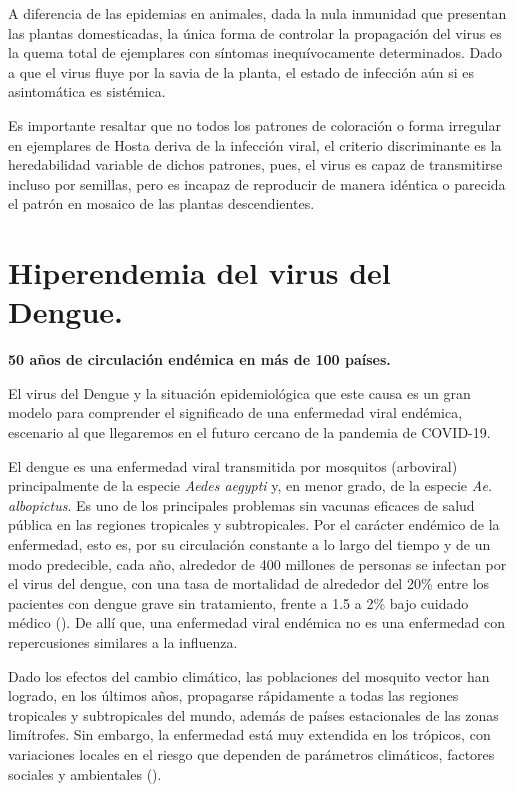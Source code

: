 \documentclass[
  12pt, krantz2,
  spanish,
]{krantz}
\begin{document}
A diferencia de las epidemias en animales, dada la nula inmunidad que presentan las plantas domesticadas, la única forma de controlar la propagación del virus es la quema total de ejemplares con síntomas inequívocamente determinados. Dado a que el virus fluye por la savia de la planta, el estado de infección aún si es asintomática es sistémica.

Es importante resaltar que no todos los patrones de coloración o forma irregular en ejemplares de Hosta deriva de la infección viral, el criterio discriminante es la heredabilidad variable de dichos patrones, pues, el virus es capaz de transmitirse incluso por semillas, pero es incapaz de reproducir de manera idéntica o parecida el patrón en mosaico de las plantas descendientes.

\hypertarget{hiperendemia-del-virus-del-dengue.}{%
\section{Hiperendemia del virus del Dengue.}\label{hiperendemia-del-virus-del-dengue.}}

\textbf{50 años de circulación endémica en más de 100 países.}

El virus del Dengue y la situación epidemiológica que este causa es un gran modelo para comprender el significado de una enfermedad viral endémica, escenario al que llegaremos en el futuro cercano de la pandemia de COVID-19.

El dengue es una enfermedad viral transmitida por mosquitos (arboviral) principalmente de la especie \emph{Aedes aegypti} y, en menor grado, de la especie \emph{Ae. albopictus}. Es uno de los principales problemas sin vacunas eficaces de salud pública en las regiones tropicales y subtropicales. Por el carácter endémico de la enfermedad, esto es, por su circulación constante a lo largo del tiempo y de un modo predecible, cada año, alrededor de 400 millones de personas se infectan por el virus del dengue, con una tasa de mortalidad de alrededor del 20\% entre los pacientes con dengue grave sin tratamiento, frente a 1.5 a 2\% bajo cuidado médico (\citet{luang2018hyperendemic}). De allí que, una enfermedad viral endémica no es una enfermedad con repercusiones similares a la influenza.

Dado los efectos del cambio climático, las poblaciones del mosquito vector han logrado, en los últimos años, propagarse rápidamente a todas las regiones tropicales y subtropicales del mundo, además de países estacionales de las zonas limítrofes. Sin embargo, la enfermedad está muy extendida en los trópicos, con variaciones locales en el riesgo que dependen de parámetros climáticos, factores sociales y ambientales (\citet{luang2018hyperendemic}).
\end{document}
